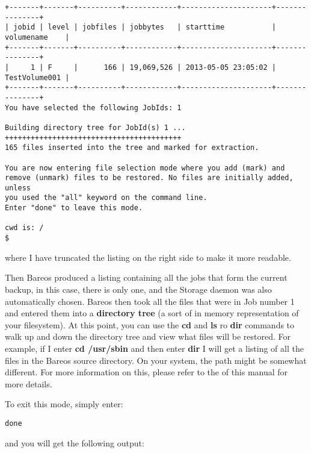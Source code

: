 \footnotesize
\begin{verbatim}
+-------+-------+----------+------------+---------------------+---------------+
| jobid | level | jobfiles | jobbytes   | starttime           | volumename    |
+-------+-------+----------+------------+---------------------+---------------+
|     1 | F     |      166 | 19,069,526 | 2013-05-05 23:05:02 | TestVolume001 |
+-------+-------+----------+------------+---------------------+---------------+
You have selected the following JobIds: 1

Building directory tree for JobId(s) 1 ...  +++++++++++++++++++++++++++++++++++++++++
165 files inserted into the tree and marked for extraction.

You are now entering file selection mode where you add (mark) and
remove (unmark) files to be restored. No files are initially added, unless
you used the "all" keyword on the command line.
Enter "done" to leave this mode.

cwd is: /
$ 
\end{verbatim}
\normalsize

where I have truncated the listing on the right side to make it more readable.

Then Bareos produced a listing containing all the jobs that
form the current backup, in this case, there is only one, and the Storage
daemon was also automatically chosen. Bareos then took all the files that were
in Job number 1 and entered them into a {\bf directory tree} (a sort of in
memory representation of your filesystem). At this point, you can use the {\bf
cd} and {\bf ls} ro {\bf dir} commands to walk up and down the directory tree
and view what files will be restored. For example, if I enter {\bf cd
/usr/sbin} and then enter {\bf dir} I will get a listing
of all the files in the Bareos source directory. On your system, the path might
be somewhat different. For more information on this, please refer to the
 of this manual for
more details.

To exit this mode, simply enter:

\footnotesize
\begin{verbatim}
done
\end{verbatim}
\normalsize

and you will get the following output:


